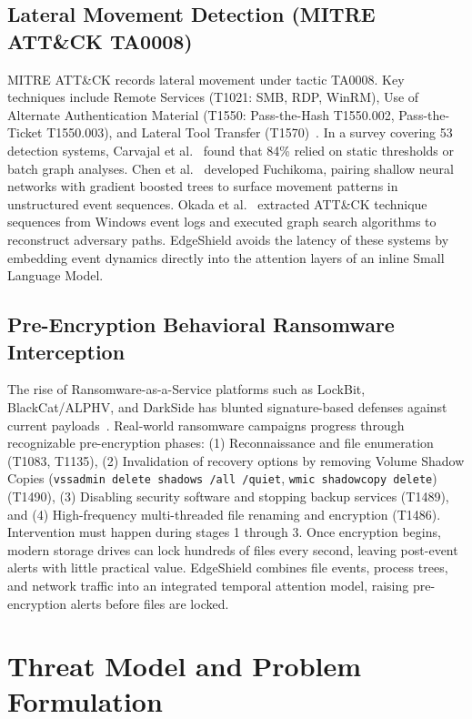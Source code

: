 \documentclass[10pt,journal,compsoc]{IEEEtran}
\begin{document}
\subsection{Lateral Movement Detection (MITRE ATT\&CK TA0008)}
MITRE ATT\&CK records lateral movement under tactic TA0008. Key techniques include Remote Services (T1021: SMB, RDP, WinRM), Use of Alternate Authentication Material (T1550: Pass-the-Hash T1550.002, Pass-the-Ticket T1550.003), and Lateral Tool Transfer (T1570)~\cite{mitre2025}. In a survey covering 53 detection systems, Carvajal et al.~\cite{carvajal2024} found that 84\% relied on static thresholds or batch graph analyses. Chen et al.~\cite{chen2023} developed Fuchikoma, pairing shallow neural networks with gradient boosted trees to surface movement patterns in unstructured event sequences. Okada et al.~\cite{okada2024} extracted ATT\&CK technique sequences from Windows event logs and executed graph search algorithms to reconstruct adversary paths. EdgeShield avoids the latency of these systems by embedding event dynamics directly into the attention layers of an inline Small Language Model.

\subsection{Pre-Encryption Behavioral Ransomware Interception}
The rise of Ransomware-as-a-Service platforms such as LockBit, BlackCat/ALPHV, and DarkSide has blunted signature-based defenses against current payloads~\cite{akhtar2024, barmpatsalou2022}. Real-world ransomware campaigns progress through recognizable pre-encryption phases: (1) Reconnaissance and file enumeration (T1083, T1135), (2) Invalidation of recovery options by removing Volume Shadow Copies (\texttt{vssadmin delete shadows /all /quiet}, \texttt{wmic shadowcopy delete}) (T1490), (3) Disabling security software and stopping backup services (T1489), and (4) High-frequency multi-threaded file renaming and encryption (T1486). Intervention must happen during stages 1 through 3. Once encryption begins, modern storage drives can lock hundreds of files every second, leaving post-event alerts with little practical value. EdgeShield combines file events, process trees, and network traffic into an integrated temporal attention model, raising pre-encryption alerts before files are locked.

\section{Threat Model and Problem Formulation}
\end{document}
